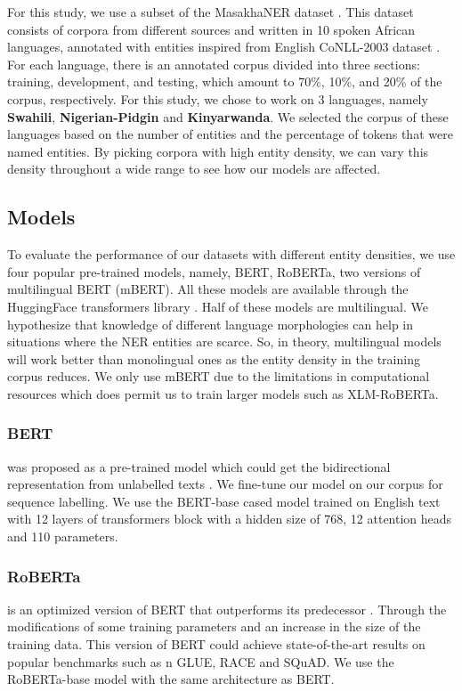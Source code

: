 \documentclass{article}
\begin{document}
For this study, we use a subset of the MasakhaNER dataset \cite{10.1162/tacl_a_00416}. This dataset consists of corpora from different sources and written in 10 spoken African languages, annotated with entities inspired from English CoNLL-2003 dataset \cite{tjong-kim-sang-2002-introduction}. For each language, there is an annotated corpus divided into three sections: training, development, and testing, which amount to 70\%, 10\%, and 20\% of the corpus, respectively. For this study, we chose to work on 3 languages, namely \textbf{Swahili}, \textbf{Nigerian-Pidgin} and \textbf{Kinyarwanda}. We selected the corpus of these languages based on the number of entities and the percentage of tokens that were named entities. By picking corpora with high entity density, we can vary this density throughout a wide range to see how our models are affected.

\subsection{Models}
To evaluate the performance of our datasets with different entity densities, we use four popular pre-trained models, namely, BERT, RoBERTa, two versions of multilingual BERT
(mBERT). All these models are available through the HuggingFace transformers library \cite{DBLP:journals/corr/abs-1910-03771}. Half of these models are multilingual. We hypothesize that knowledge of different language morphologies can help in situations where the NER entities are scarce. So, in theory, multilingual models will work better than monolingual ones as the entity density in the training corpus reduces. We only use mBERT due to the limitations in computational resources which does permit us to train larger models such as XLM-RoBERTa.

\subsubsection*{BERT} was proposed as a pre-trained model which could get the bidirectional representation from unlabelled texts \cite{DBLP:journals/corr/abs-1810-04805}. We fine-tune our model on our corpus for sequence labelling. We use the BERT-base cased model trained on English text with 12 layers of transformers block with a hidden size of 768, 12 attention heads and 110 parameters.

\subsubsection*{RoBERTa} is an optimized version of BERT that outperforms its predecessor \cite{DBLP:journals/corr/abs-1907-11692}. Through the modifications of some training parameters and an increase in the size of the training data. This version of BERT could achieve state-of-the-art results on popular benchmarks such as n GLUE, RACE and SQuAD. We use the RoBERTa-base model with the same architecture as BERT.
\end{document}

